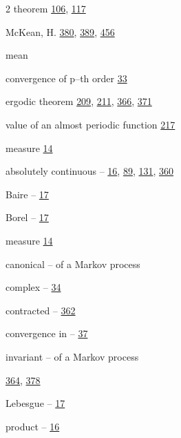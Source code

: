 \begin{multicols}{2}
\hspace*{1.1em}theorem \hyperlink{page.106}{106}, \hyperlink{page.117}{117}\par
\noindent McKean, H. \hyperlink{page.380}{380}, \hyperlink{page.389}{389}, \hyperlink{page.456}{456}\par
\noindent mean\par
\hspace*{1.1em}convergence of p--th order \hyperlink{page.33}{33}\par
\hspace*{1.1em}ergodic theorem \hyperlink{page.209}{209}, \hyperlink{page.211}{211}, \hyperlink{page.366}{366}, \hyperlink{page.371}{371}\par
\hspace*{1.1em}value of an almost periodic function \hyperlink{page.217}{217}\par
\noindent measure \hyperlink{page.14}{14}\par
\hspace*{1.1em}absolutely continuous -- \hyperlink{page.16}{16}, \hyperlink{page.89}{89}, \hyperlink{page.131}{131}, \hyperlink{page.360}{360}\par
\hspace*{1.1em}Baire -- \hyperlink{page.17}{17}\par
\hspace*{1.1em}Borel -- \hyperlink{page.17}{17}\par
\noindent measure \hyperlink{page.14}{14}\par
\hspace*{1.1em}canonical -- of a Markov process\par
\hspace*{1.1em}complex -- \hyperlink{page.34}{34}\par
\hspace*{1.1em}contracted -- \hyperlink{page.362}{362}\par
\hspace*{1.1em}convergence in -- \hyperlink{page.37}{37}\par
\hspace*{1.1em}invariant -- of a Markov process\par
\noindent \hyperlink{page.364}{364}, \hyperlink{page.378}{378}\par
\hspace*{1.1em}Lebesgue -- \hyperlink{page.17}{17}\par
\hspace*{1.1em}product -- \hyperlink{page.16}{16}\par

\end{multicols}
